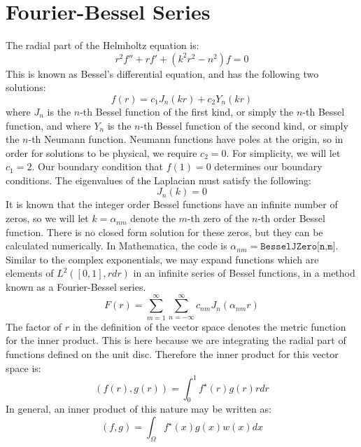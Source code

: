 \documentclass{article}
\begin{document}
\section{Fourier-Bessel Series}
The radial part of the Helmholtz equation is:
\begin{equation}
  r^2 f''+ rf' + (k^2 r^2 - n^2) f = 0
\end{equation}
This is known as Bessel's differential equation, and has the following two solutions:
\begin{equation}
  f(r) = c_1 J_n(k r) + c_2 Y_n (k r)
\end{equation}
where $J_n$ is the $n$-th Bessel function of the first kind, or simply the $n$-th Bessel function, and where $Y_n$ is the $n$-th Bessel function of the second kind, or simply the $n$-th Neumann function. Neumann functions have poles at the origin, so in order for solutions to be physical, we require $c_2 = 0$. For simplicity, we will let $c_1 = 2$. Our boundary condition that $f(1)= 0$ determines our boundary conditions. The eigenvalues of the Laplacian must satisfy the following:
\begin{equation}
  \boxed{
    J_n(k) = 0
  }
\end{equation}
It is known that the integer order Bessel functions have an infinite number of zeros, so we will let $k = \alpha_{nm}$ denote the $m$-th zero of the $n$-th order Bessel function. There is no closed form solution for these zeros, but they can be calculated numerically. In Mathematica, the code is $\alpha_{nm} = \texttt{BesselJZero[n,m]}$.\\
Similar to the complex exponentials, we may expand functions which are elements of $L^2([0,1],rdr)$ in an infinite series of Bessel functions, in a method known as a Fourier-Bessel series.
\begin{equation}
  F(r) = \sum_{m = 1}^{\infty} \sum_{n = -\infty}^\infty c_{nm} J_n(\alpha_{nm} r)
\end{equation}
The factor of $r$ in the definition of the vector space denotes the metric function for the inner product. This is here because we are integrating the radial part of functions defined on the unit disc. Therefore the inner product for this vector space is:
\begin{equation}
  (f(r),g(r)) = \int_0^1 f^\star(r)g(r)r dr
\end{equation}
In general, an inner product of this nature may be written as:
\begin{equation}
  (f,g) = \int_\Omega f^\star (x) g(x) w(x)dx
\end{equation}
\end{document}
